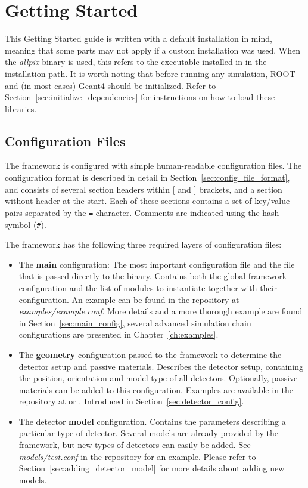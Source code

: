 \chapter{Getting Started}
\label{ch:gettingstarted}

This Getting Started guide is written with a default installation in mind, meaning that some parts may not apply if a custom installation was used.
When the \textit{allpix} binary is used, this refers to the executable installed in  in the installation path.
It is worth noting that before running any \apsq simulation, ROOT and (in most cases) Geant4 should be initialized.
Refer to Section~\ref{sec:initialize_dependencies} for instructions on how to load these libraries.

\section{Configuration Files}
\label{sec:configuration_files}
The framework is configured with simple human-readable configuration files.
The configuration format is described in detail in Section~\ref{sec:config_file_format}, and consists of several section headers within $[$ and $]$ brackets, and a section without header at the start.
Each of these sections contains a set of key/value pairs separated by the \texttt{=} character.
Comments are indicated using the hash symbol (\texttt{\#}).

The framework has the following three required layers of configuration files:
\begin{itemize}
\item The \textbf{main} configuration: The most important configuration file and the file that is passed directly to the binary.
Contains both the global framework configuration and the list of modules to instantiate together with their configuration.
An example can be found in the repository at \textit{examples/example.conf}.
More details and a more thorough example are found in Section~\ref{sec:main_config}, several advanced simulation chain configurations are presented in Chapter~\ref{ch:examples}.
\item The \textbf{geometry} configuration passed to the framework to determine the detector setup and passive materials.
Describes the detector setup, containing the position, orientation and model type of all detectors.
Optionally, passive materials can be added to this configuration.
Examples are available in the repository at  or .
Introduced in Section~\ref{sec:detector_config}.
\item The detector \textbf{model} configuration.
Contains the parameters describing a particular type of detector.
Several models are already provided by the framework, but new types of detectors can easily be added.
See \textit{models/test.conf} in the repository for an example.
Please refer to Section~\ref{sec:adding_detector_model} for more details about adding new models.
\end{itemize}

